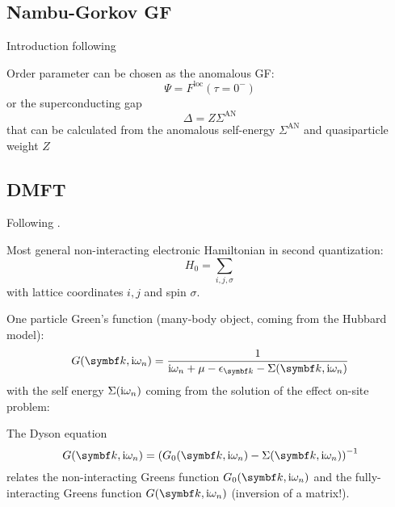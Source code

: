 \documentclass[../notes.tex]{subfiles}
\begin{document}
\subsection{Nambu-Gorkov GF}

Introduction following~\cite[ch. 14.7]{colemanIntroductionManyBodyPhysics2015}


Order parameter can be chosen as the anomalous GF:
\begin{equation}
	\Psi = F^{\mathrm{loc}} (\tau = 0^-)
\end{equation}
or the superconducting gap
\begin{equation}
	\Delta = Z \Sigma^{\mathrm{AN}}
\end{equation}
that can be calculated from the anomalous self-energy \(\Sigma^{\mathrm{AN}}\) and quasiparticle weight \(Z\)


\subsection{DMFT}

Following \cite{georgesDynamicalMeanfieldTheory1996}.

Most general non-interacting electronic Hamiltonian in second quantization:
\begin{equation}
	H_0 = \sum_{i, j, \sigma}
\end{equation}
with lattice coordinates \(i, j\) and spin \(\sigma\).

One particle Green's function (many-body object, coming from the Hubbard model):
\begin{equation}
	G(\vb{k}, \iu \omega_n) = \frac{1}{\iu \omega_n + \mu - \epsilon_{\vb{k}} - \Sigma(\vb{k}, \iu \omega_n)}
\end{equation}
with the self energy \(\Sigma(\mathrm{i} \omega_n)\) coming from the solution of the effect on-site problem:

The Dyson equation
\begin{equation}
	G(\vb{k}, \iu \omega_n) = \left( G_0 (\vb{k}, \iu \omega_n) - \Sigma(\vb{k}, \iu \omega_n)\right)^{-1}
\end{equation}
relates the non-interacting Greens function \(G_0 (\vb{k}, \iu \omega_n)\) and the fully-interacting Greens function \(G (\vb{k}, \iu \omega_n)\) (inversion of a matrix!).
\end{document}
